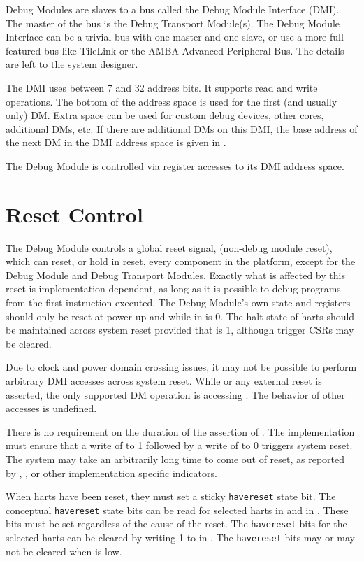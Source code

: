 Debug Modules are slaves to a bus called the Debug Module Interface (DMI). The
master of the bus is the Debug Transport Module(s).
The Debug Module Interface can be a trivial bus with one master and one slave,
or use a more full-featured bus like TileLink or the AMBA Advanced Peripheral
Bus. The details are left to the system designer.

The DMI uses between 7 and 32 address bits.  It supports read and write
operations.  The bottom of the address space is
used for the first (and usually only) DM. Extra space can be used for custom
debug devices, other cores, additional DMs, etc. If there are additional DMs
on this DMI, the base address of the next DM in the DMI address space is given
in \Rnextdm.


The Debug Module is controlled via register accesses to its DMI address space.

\section{Reset Control} \label{reset}

The Debug Module controls a global reset signal, \Fndmreset
(non-debug module reset),
which can reset, or hold in reset, every component in the platform,
except for the Debug Module and Debug Transport Modules.
Exactly what is affected by this reset is implementation dependent, as long as
it is possible to debug programs from the first instruction executed.
The Debug Module's own state and registers should only be
reset at power-up and while
\Fdmactive in \Rdmcontrol is 0.
The halt state of harts should be
maintained across system reset provided that \Fdmactive is 1,
although trigger CSRs may be cleared.

Due to clock and power domain crossing issues,
it may not be possible to perform arbitrary DMI accesses across
system reset.
While \Fndmreset or any external reset is asserted, the only supported DM
operation is accessing \Rdmcontrol. The behavior of other accesses is
undefined.

There is no requirement on the duration of the assertion of \Fndmreset.
The implementation must ensure that a write of \Fndmreset to 1 followed by
a write of \Fndmreset to 0 triggers system reset. The system may take
an arbitrarily long time to come out of reset, as reported by \Fallunavail,
\Fanyunavail, or other implementation specific indicators.

When harts have been reset, they must set a sticky {\tt havereset} state bit.
The conceptual {\tt havereset} state bits can be read for selected harts in
\Fanyhavereset and \Fallhavereset in \Rdmstatus.
These bits must be set regardless of the cause of the reset.
The {\tt havereset} bits for the selected harts
can be cleared by writing 1 to \Fackhavereset in \Rdmcontrol.
The {\tt havereset} bits may or may not be cleared 
when \Fdmactive is low.

